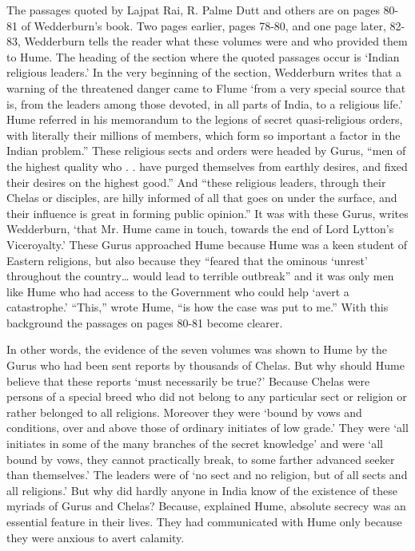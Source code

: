 The passages quoted by Lajpat Rai, R. Palme Dutt and others are on pages 80-81 of Wedderburn’s book. Two pages earlier, pages 78-80, and one page later, 82-83, Wedderburn tells the reader what these volumes were and who provided them to Hume. The heading of the section where the quoted passages occur is ‘Indian religious leaders.’ In the very beginning of the section, Wedderburn writes that a warning of the threatened danger came to Flume ‘from a very special source that is, from the leaders among those devoted, in all parts of India, to a religious life.’ Hume referred in his memorandum to the legions of secret quasi-religious orders, with literally their millions of members, which form so important a factor in the Indian problem.” These religious sects and orders were headed by Gurus, “men of the highest quality who . . have purged themselves from earthly desires, and fixed their desires on the highest good.” And “these religious leaders, through their Chelas or disciples, are hilly informed of all that goes on under the surface, and their influence is great in forming public opinion.” It was with these Gurus, writes Wedderburn, ‘that Mr. Hume came in touch, towards the end of Lord Lytton’s Viceroyalty.’ These Gurus approached Hume because Hume was a keen student of Eastern religions, but also because they “feared that the ominous ‘unrest’ throughout the country… would lead to terrible outbreak” and it was only men like Hume who had access to the Government who could help ‘avert a catastrophe.’ “This,” wrote Hume, “is how the case was put to me.” With this background the passages on pages 80-81 become clearer.

In other words, the evidence of the seven volumes was shown to Hume by the Gurus who had been sent reports by thousands of Chelas. But why should Hume believe that these reports ‘must necessarily be true?’ Because Chelas were persons of a special breed who did not belong to any particular sect or religion or rather belonged to all religions. Moreover they were ‘bound by vows and conditions, over and above those of ordinary initiates of low grade.’ They were ‘all initiates in some of the many branches of the secret knowledge’ and were ‘all bound by vows, they cannot practically break, to some farther advanced seeker than themselves.’ The leaders were of ‘no sect and no religion, but of all sects and all religions.’ But why did hardly anyone in India know of the existence of these myriads of Gurus and Chelas? Because, explained Hume, absolute secrecy was an essential feature in their lives. They had communicated with Hume only because they were anxious to avert calamity.

